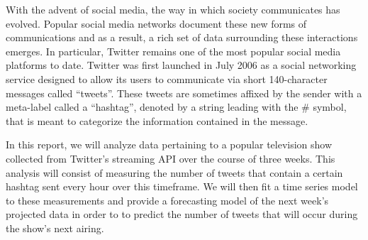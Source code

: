 With the advent of social media, the way in which society communicates has evolved. Popular
social media networks document these new forms of communications and as a result, a rich
set of data surrounding these interactions emerges. In particular, Twitter
remains one of the most popular social media platforms
to date. Twitter was first launched in July 2006 as a social networking service
designed to allow its users to communicate via short 140-character messages
called ``tweets''. These tweets are sometimes affixed by the sender with a meta-label
called a ``hashtag'', denoted by a string leading with the \# symbol, that is
meant to categorize the information contained in the
message.

In this report, we will analyze data pertaining to a popular television show
collected from Twitter's streaming API over the course of three weeks. This
analysis will consist of measuring the number of tweets that contain a certain
hashtag sent every hour over this timeframe. We will then fit a time
series model to these measurements and provide a forecasting model of the next
week's projected data in order to to predict the number of tweets that will occur during the show's next airing.